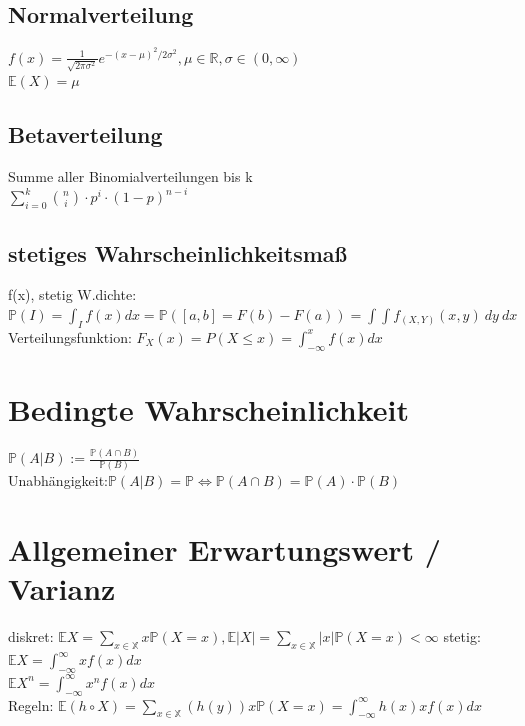 \documentclass[]{article}
\begin{document}
\subsection{Normalverteilung}
$f(x)=\frac{1}{ \sqrt{2 \pi \sigma^2} } e^{-(x-\mu)^2 /2\sigma^2}, \mu \in \mathbb{R}, \sigma \in(0,\infty)$\\
$\mathbb{E}(X)=\mu$
\subsection{Betaverteilung}
Summe aller Binomialverteilungen bis k\\
$\sum_{i=0}^k \binom{n}{i} \cdot p^i \cdot (1-p)^{n-i} $
\subsection{stetiges Wahrscheinlichkeitsmaß}
f(x), stetig W.dichte: \\
$\mathbb{P}(I)=\int_I f(x)dx=\mathbb{P}([a,b]=F(b)-F(a)) =\int \int f_{(X,Y)}(x,y)\ 
dy\ dx$ \\
Verteilungsfunktion: $F_X(x)=P(X\leq x)=\int_{-\infty}^x f(x) dx$
\section{Bedingte Wahrscheinlichkeit}
$\mathbb{P}(A|B):=\frac{\mathbb{P}(A\cap B)}{\mathbb{P}(B)}$\\
Unabhängigkeit:$\mathbb{P}(A|B)=\mathbb{P} \Leftrightarrow \mathbb{P}(A \cap B)=\mathbb{P}(A) \cdot \mathbb{P}(B)$ 
\section{Allgemeiner Erwartungswert / Varianz }
diskret: $\mathbb{E}X =\sum_{x \in \mathbb{X}} x \mathbb{P}(X=x), \mathbb{E}|X|=\sum_{x \in \mathbb{X}} |x| \mathbb{P}(X=x) <\infty   $
stetig: $\mathbb{E}X =\int_{-\infty}^{\infty} x f(x) dx $\\ $\mathbb{E}X^n =\int_{-\infty}^{\infty} x^n f(x) dx $\\
Regeln:
$\mathbb{E}(h \circ X) =\sum_{x \in \mathbb{X}} (h(y)) x \mathbb{P}(X=x) =\int_{-\infty}^{\infty} h(x) x f(x) dx $
\end{document}
